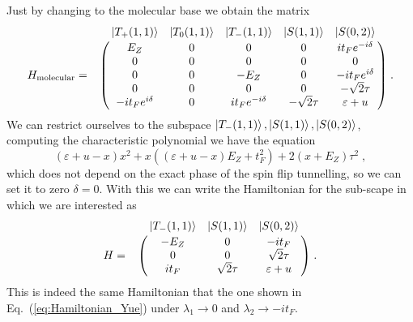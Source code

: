 \documentclass[a4paper,11pt]{article}
\begin{document}
Just by changing to the molecular base we obtain the matrix
\begin{equation}
H_{\text{molecular}}=\bordermatrix{~ & \ket{T_+(1,1)} & \ket{T_0(1,1)} & \ket{T_-(1,1)} & \ket{S(1,1)} & \ket{S(0,2)}\cr
	~ & E_Z   			 & 0     & 0      			  & 0    		   & it_Fe^{-i\delta}	 \cr
	~ & 0     			 & 0     & 0      			  & 0    		   & 0 		  	 		 \cr
	~ & 0     			 & 0     & -E_Z   			  & 0    		   & -it_Fe^{i\delta}    \cr
	~ & 0     			 & 0     & 0      			  & 0    		   & -\sqrt{2}\tau 		 \cr
	~ & -it_Fe^{i\delta} & 0     & it_Fe^{-i\delta}   & -\sqrt{2}\tau  & \varepsilon+u}\; .
\end{equation} We can restrict ourselves to the subspace $\ket{T_-(1,1)}, \ket{S(1,1)}, \ket{S(0,2)}$, computing the characteristic polynomial we have the equation
\begin{equation}
	(\varepsilon+u-x)x^2+x((\varepsilon+u-x)E_Z+t_F^2)+2(x+E_Z)\tau^2\; ,
\end{equation}
which does not depend on the exact phase of the spin flip tunnelling, so we can set it to zero $\delta=0$. With this we can write the Hamiltonian for the sub-scape in which we are interested as
\begin{equation}
H=\bordermatrix{~ & \ket{T_-(1,1)} & \ket{S(1,1)} & \ket{S(0,2)}\cr
	~ & -E_Z & 0 & -it_F \cr
	~ & 0 & 0 & \sqrt{2}\tau \cr
	~ & it_F & \sqrt{2}\tau & \varepsilon+u \cr}\; .
\end{equation}
This is indeed the same Hamiltonian that the one shown in Eq.~(\ref{eq:Hamiltonian_Yue}) under $\lambda_1\rightarrow 0$ and $\lambda_2\rightarrow -it_F$.




\end{document}
